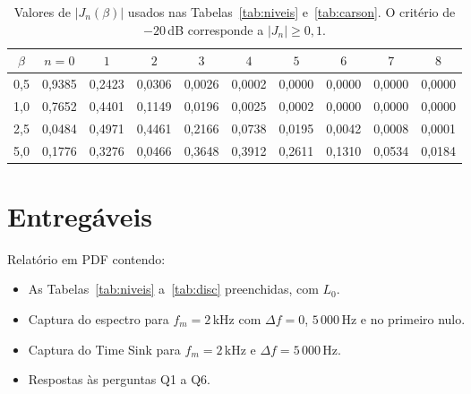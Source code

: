 \documentclass[11pt,a4paper]{article}
\begin{document}
\begin{table}[H]
  \centering
  \begin{tabular}{c c c c c c c c c c}
    \toprule
    $\beta$ & $n=0$  & $1$    & $2$    & $3$    & $4$    & $5$    & $6$    & $7$    & $8$    \\
    \midrule
    0,5     & 0,9385 & 0,2423 & 0,0306 & 0,0026 & 0,0002 & 0,0000 & 0,0000 & 0,0000 & 0,0000 \\
    1,0     & 0,7652 & 0,4401 & 0,1149 & 0,0196 & 0,0025 & 0,0002 & 0,0000 & 0,0000 & 0,0000 \\
    2,5     & 0,0484 & 0,4971 & 0,4461 & 0,2166 & 0,0738 & 0,0195 & 0,0042 & 0,0008 & 0,0001 \\
    5,0     & 0,1776 & 0,3276 & 0,0466 & 0,3648 & 0,3912 & 0,2611 & 0,1310 & 0,0534 & 0,0184 \\
    \bottomrule
  \end{tabular}
  \caption{Valores de $|J_n(\beta)|$ usados nas Tabelas~\ref{tab:niveis}
    e~\ref{tab:carson}. O critério de $-20$\,dB corresponde a $|J_n|\ge 0{,}1$.}
  \label{tab:bessel}
\end{table}

\section*{Entregáveis}

Relatório em PDF contendo:
\begin{itemize}
  \item As Tabelas~\ref{tab:niveis} a~\ref{tab:disc} preenchidas, com $L_0$.
  \item Captura do espectro para $f_m = 2$\,kHz com $\Delta f = 0$,
        $5\,000$\,Hz e no primeiro nulo.
  \item Captura do Time Sink para $f_m = 2$\,kHz e $\Delta f = 5\,000$\,Hz.
  \item Respostas às perguntas Q1 a Q6.
\end{itemize}
\end{document}
